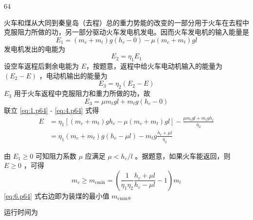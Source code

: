 \begin{solution}{64}
    \begin{subsolution}
        火车和煤从大同到秦皇岛（去程）总的重力势能的改变的一部分用于火车在去程中克服阻力所做的功，另一部分驱动火车发电机发电。因而火车发电机的输入能量是
        \begin{equation}
            E_{1} = (m_{c} + m_{t}) g (h_{c} - 0) - \mu (m_{c} + m_{t}) g l
            \label{eq:1.p64}
        \end{equation}
        发电机发出的电能为
        \begin{equation}
            E_{2} = \eta_{1} E_{1}
            \label{eq:2.p64}
        \end{equation}
        设空车返程后剩余电能为 $E$，按题意，返程中给火车电动机输入的能量为 $(E_{2} - E)$ ，电动机输出的能量为
        \begin{equation}
            E_{3} = \eta_{2} (E_{2} - E)
            \label{eq:3.p64}
        \end{equation}
        $E_{3}$ 用于火车返程中克服阻力和重力所做的功，故
        \begin{equation}
            E_{3} = \mu m_{t} g l + m_{t} g (h_{c} - 0)
            \label{eq:4.p64}
        \end{equation}
        联立 \eqref{eq:1.p64} - \eqref{eq:4.p64} 式得
        \begin{align}
            E &= \eta_{1} \left[ (m_{c} + m_{t}) g h_{c} - \mu (m_{c} + m_{t}) g l \right] - \frac{\mu m_{t} g l + m_{t} g h_{c}}{\eta_{2}} \nonumber \\
              &= \eta_{1} (m_{c} + m_{t}) g (h_{c} - \mu l) - m_{t} g \frac{h_{c} + \mu l}{\eta_{2}}
            \label{eq:5.p64}
        \end{align}
    \end{subsolution}
    \begin{subsolution}
        由 $E_{1} \geq 0$ 可知阻力系数 $\mu$ 应满足 $\mu < h_{c}/l$ 。据题意，如果火车能返回，则 $E \geq 0$ ，可得
        \begin{equation}
            m_{c} \geq m_{\text{cmin}} = \left( \frac{1}{\eta_{1} \eta_{2}} \frac{h_{c} + \mu l}{h_{c} - \mu l} - 1 \right) m_{t}
            \label{eq:6.p64}
        \end{equation}
        \eqref{eq:6.p64} 式右边即为装煤的最小值 $m_{\text{cmin}}$。
    \end{subsolution}
    \begin{subsolution}
        运行时间为
        \begin{equation}

\end{equation}
\end{subsolution}
\end{solution}
